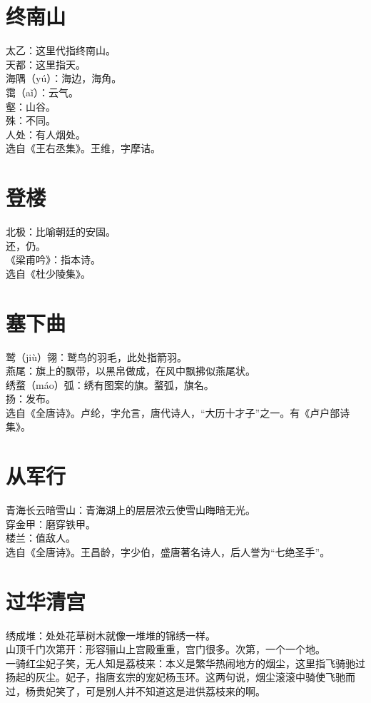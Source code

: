\documentclass[a4paper, 12pt]{article}
\begin{document}
    \section{终南山}
        \noindent 太乙：这里代指终南山。
        \\ 天都：这里指天。
        \\ 海隅（y\'{u}）：海边，海角。
        \\ 霭（a\v{i}）：云气。
        \\ 壑：山谷。
        \\ 殊：不同。
        \\ 人处：有人烟处。
        \\ 选自《王右丞集》。王维，字摩诘。
    \section{登楼}
        \noindent 北极：比喻朝廷的安固。
        \\ 还，仍。
        \\ 《梁甫吟》：指本诗。
        \\ 选自《杜少陵集》。
    \section{塞下曲}
        \noindent 鹫（ji\`{u}）翎：鹫鸟的羽毛，此处指箭羽。
        \\ 燕尾：旗上的飘带，以黑帛做成，在风中飘拂似燕尾状。
        \\ 绣蝥（m\'{a}o）弧：绣有图案的旗。蝥弧，旗名。
        \\ 扬：发布。
        \\ 选自《全唐诗》。卢纶，字允言，唐代诗人，“大历十才子”之一。有《卢户部诗集》。
    \section{从军行}
        \noindent 青海长云暗雪山：青海湖上的层层浓云使雪山晦暗无光。
        \\ 穿金甲：磨穿铁甲。
        \\ 楼兰：值敌人。
        \\ 选自《全唐诗》。王昌龄，字少伯，盛唐著名诗人，后人誉为“七绝圣手”。
    \section{过华清宫}
        \noindent 绣成堆：处处花草树木就像一堆堆的锦绣一样。
        \\ 山顶千门次第开：形容骊山上宫殿重重，宫门很多。次第，一个一个地。
        \\ 一骑红尘妃子笑，无人知是荔枝来：本义是繁华热闹地方的烟尘，这里指飞骑驰过扬起的灰尘。妃子，指唐玄宗的宠妃杨玉环。这两句说，烟尘滚滚中骑使飞驰而过，杨贵妃笑了，可是别人并不知道这是进供荔枝来的啊。
\end{document}
